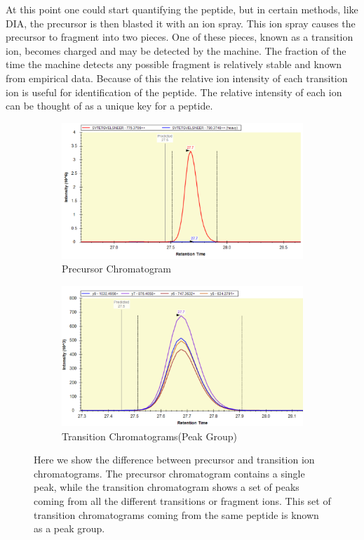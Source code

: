 \documentclass[12pt]{article}
\begin{document}
{At this point one could start quantifying the peptide, but in certain methods, like DIA, the precursor is then blasted it with an ion spray. This ion spray causes the precursor to fragment into two pieces. One of these pieces, known as a transition ion, becomes charged and may be detected by the machine. The fraction of the time the machine detects any possible fragment is relatively stable and known from empirical data. Because of this the relative ion intensity of each transition ion is useful for identification of the peptide. The relative intensity of each ion can be thought of as a unique key for a peptide.

\begin{figure}
\centering
\begin{subfigure}{.5\textwidth}
  \centering
  \includegraphics[width=1\linewidth]{precursor}
  \caption{Precursor Chromatogram}
  \label{fig:sub1}
\end{subfigure}%
\begin{subfigure}{.5\textwidth}
  \centering
  \includegraphics[width=1\linewidth]{transitions}
  \caption{Transition Chromatograms(Peak Group)}
  \label{fig:sub2}
\end{subfigure}
\caption{Here we show the difference between precursor and transition ion chromatograms. The precursor chromatogram contains a single peak, while the transition chromatogram shows a set of peaks coming from all the different transitions or fragment ions. This set of transition chromatograms coming from the same peptide is known as a peak group.}
\label{fig:test}
\end{figure}


}
\end{document}

